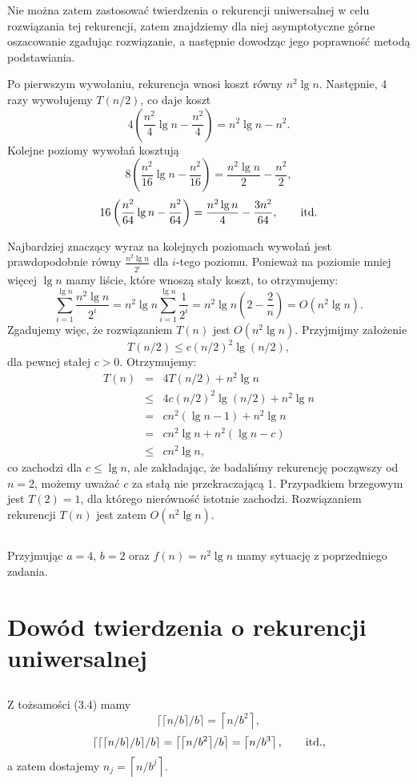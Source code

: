 Nie można zatem zastosować twierdzenia o rekurencji uniwersalnej w celu rozwiązania tej rekurencji, zatem znajdziemy dla niej asymptotyczne górne oszacowanie zgadując rozwiązanie, a następnie dowodząc jego poprawność metodą podstawiania.

Po pierwszym wywołaniu, rekurencja wnosi koszt równy $n^2\lg n$. Następnie, 4 razy wywołujemy $T(n/2)$, co daje koszt
\[
	4\left(\frac{n^2}{4}\lg n-\frac{n^2}{4}\right) = n^2\lg n-n^2.
\]
Kolejne poziomy wywołań kosztują
\[
	8\left(\frac{n^2}{16}\lg n-\frac{n^2}{16}\right) = \frac{n^2\lg n}{2}-\frac{n^2}{2},
\]
\[
	16\left(\frac{n^2}{64}\lg n-\frac{n^2}{64}\right) = \frac{n^2\lg n}{4}-\frac{3n^2}{64},\qquad\hbox{itd.}
\]

Najbardziej znaczący wyraz na kolejnych poziomach wywołań jest prawdopodobnie równy $\frac{n^2\lg n}{2^i}$ dla $i$-tego poziomu. Ponieważ na poziomie mniej więcej $\lg n$ mamy liście, które wnoszą stały koszt, to otrzymujemy:
\[
	\sum_{i=1}^{\lg n}\frac{n^2\lg n}{2^i} = n^2\lg n\sum_{i=1}^{\lg n}\frac{1}{2^i} = n^2\lg n\left(2-\frac{2}{n}\right) = O(n^2\lg n).
\]
Zgadujemy więc, że rozwiązaniem $T(n)$ jest $O(n^2\lg n)$. Przyjmijmy założenie
\[
	T(n/2) \le c(n/2)^2\lg(n/2),
\]
dla pewnej stałej $c>0$. Otrzymujemy:
\begin{eqnarray*}
	T(n) &=& 4T(n/2)+n^2\lg n \\
	&\le& 4c(n/2)^2\lg(n/2)+n^2\lg n \\
	&=& cn^2(\lg n-1)+n^2\lg n \\
	&=& cn^2\lg n+n^2(\lg n-c) \\
	&\le& cn^2\lg n,
\end{eqnarray*}
co zachodzi dla $c\le\lg n$, ale zakładając, że badaliśmy rekurencję począwszy od $n=2$, możemy uważać $c$ za stałą nie przekraczającą 1. Przypadkiem brzegowym jest $T(2)=1$, dla którego nierówność istotnie zachodzi. Rozwiązaniem rekurencji $T(n)$ jest zatem $O(n^2\lg n)$.

\subsection{} %
Przyjmując $a=4$, $b=2$ oraz $f(n)=n^2\lg n$ mamy sytuację z poprzedniego zadania.

\section{Dowód twierdzenia o rekurencji uniwersalnej}

\subsection{} %
Z tożsamości (3.4) mamy
\[
	\lceil\lceil n/b\rceil/b\rceil = \left\lceil n/b^2\right\rceil,
\]
\[
	\lceil\lceil\lceil n/b\rceil/b\rceil/b\rceil = \left\lceil\left\lceil n/b^2\right\rceil\!/b\right\rceil = \left\lceil n/b^3\right\rceil,\qquad\hbox{itd.,}
\]
a zatem dostajemy $n_j=\left\lceil n/b^j\right\rceil$.

